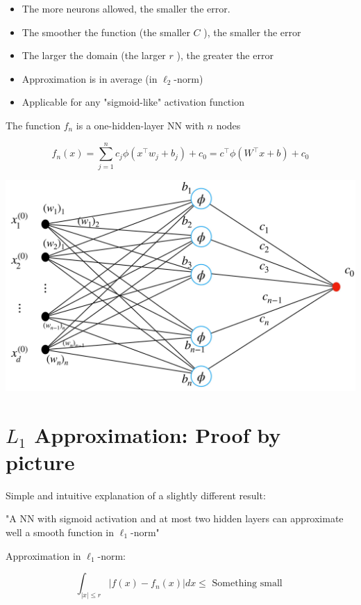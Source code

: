 \documentclass[10pt]{article}
\begin{document}
\begin{itemize}
  \item The more neurons allowed, the smaller the error.
  \item The smoother the function (the smaller $C$ ), the smaller the error
  \item The larger the domain (the larger $r$ ), the greater the error
  \item Approximation is in average (in $\ell_{2}$-norm)
  \item Applicable for any "sigmoid-like" activation function
\end{itemize}

The function $f_{n}$ is a one-hidden-layer $\mathrm{NN}$ with $n$ nodes

$$
f_{n}(x)=\sum_{j=1}^{n} c_{j} \phi\left(x^{\top} w_{j}+b_{j}\right)+c_{0}=c^{\top} \phi\left(W^{\top} x+b\right)+c_{0}
$$

\begin{center}
\includegraphics[max width=\textwidth]{2024_01_08_0e0dcffe4bc8c6049046g-18}
\end{center}

\section*{$L_{1}$ Approximation: Proof by picture}
Simple and intuitive explanation of a slightly different result:

"A NN with sigmoid activation and at most two hidden layers can approximate well a smooth function in $\ell_{1}$-norm"

Approximation in $\ell_{1}$-norm:

$$
\int_{|x| \leq r}\left|f(x)-f_{n}(x)\right| d x \leq \text { Something small }
$$
\end{document}
